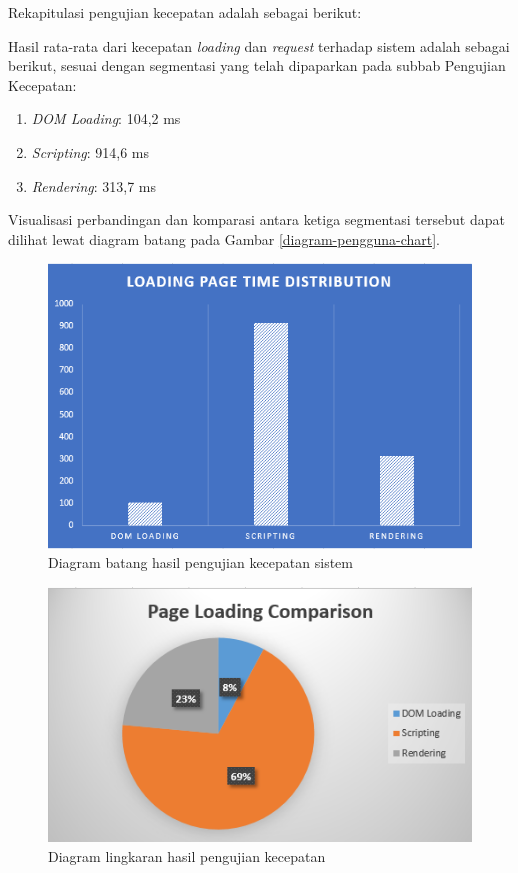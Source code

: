 Rekapitulasi pengujian kecepatan adalah sebagai berikut:

Hasil rata-rata dari kecepatan \textit{loading} dan \textit{request} terhadap sistem adalah sebagai berikut, sesuai dengan segmentasi yang telah dipaparkan pada subbab Pengujian Kecepatan:
\begin{enumerate}
	\item \textit{DOM Loading}: 104,2 ms
	\item \textit{Scripting}: 914,6 ms
	\item \textit{Rendering}: 313,7 ms
\end{enumerate}

Visualisasi perbandingan dan komparasi antara ketiga segmentasi tersebut dapat dilihat lewat diagram batang pada Gambar \ref{diagram-pengguna-chart}.

\begin{figure}[H]
	\centering
	\includegraphics[width=\textwidth]{images/bab5/speed/bar-chart.png}
	\caption{Diagram batang hasil pengujian kecepatan sistem }
	\label{chart-speed-test}
\end{figure}

\begin{figure}[H]
	\centering
	\includegraphics[width=\textwidth]{images/bab5/speed/circle-chart.png}
	\caption{Diagram lingkaran hasil pengujian kecepatan}
	\label{circle-chart-speed-test}
\end{figure}

